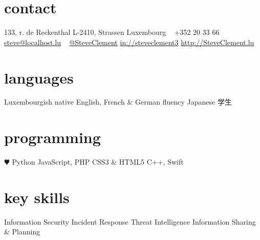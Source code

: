 \documentclass[a4paper]{friggeri-cv} %
\begin{document}


\begin{aside} %
\section{contact}
\pin \hfill 133, r. de Reckenthal
L-2410, Strassen
Luxembourg
~
{\Large\textcolor{gray}{\Mobilefone}} \hfill +352 20 33 66
{\Large\textcolor{gray}{\Letter}}\hfill\href{mailto:steve@localhost.lu}{steve@localhost.lu}
~
\tlogo \hfill \href{http://twitter.com/SteveClement}{@SteveClement}
\llogo \hfill \href{http://linkedin.com/in/SteveClement3}{in://steveclement3}
\href{http://SteveClement.lu}{http://SteveClement.lu}
\section{languages}
Luxembourgish native
English, French \& German fluency
Japanese 学生
\section{programming}
{\color{red} $\varheartsuit$} Python
JavaScript, PHP
CSS3 \& HTML5
C++, Swift
\section{key skills}
Information Security
Incident Response
Threat Intelligence
Information Sharing \& Planning
\end{aside}

\end{document}

